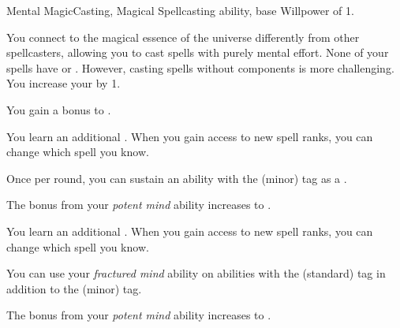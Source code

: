     \begin{feat}{Mental Magic}{Casting, Magical}
        \featpre Spellcasting ability, base Willpower of 1.

         You connect to the magical essence of the universe differently from other spellcasters, allowing you to cast spells with purely mental effort.
        None of your spells have  or .
        However, casting spells without components is more challenging.
        You increase your  by 1.

         You gain a  bonus to  .

         You learn an additional .
        When you gain access to new spell ranks, you can change which spell you know.

         Once per round, you can sustain an ability with the  (minor) tag as a .

         The bonus from your \textit{potent mind} ability increases to .

         You learn an additional .
        When you gain access to new spell ranks, you can change which spell you know.

         You can use your \textit{fractured mind} ability on abilities with the  (standard) tag in addition to the  (minor) tag.

         The bonus from your \textit{potent mind} ability increases to .
    \end{feat}

